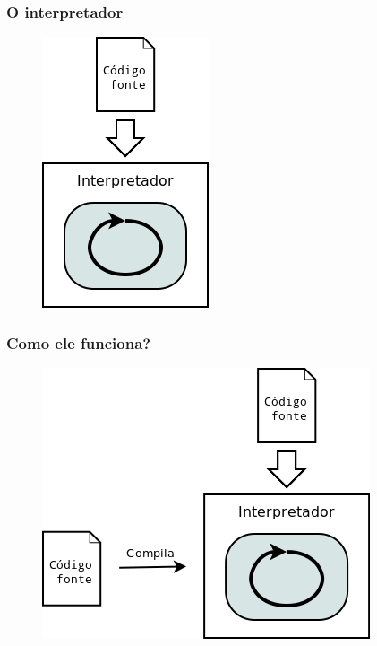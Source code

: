 \documentclass[brazil]{beamer}
\begin{document}
\begin{frame}[fragile]
  \frametitle{O interpretador}
  \begin{figure}
    \includegraphics[height=.5\textheight]{images/interpretador.png}
  \end{figure}
\end{frame}
\begin{frame}[fragile]
  \frametitle{Como ele funciona?}
  \begin{figure}
    \includegraphics[height=.5\textheight]{images/nativo-vs-virtual-01.png}
  \end{figure}
\end{frame}
\end{document}
